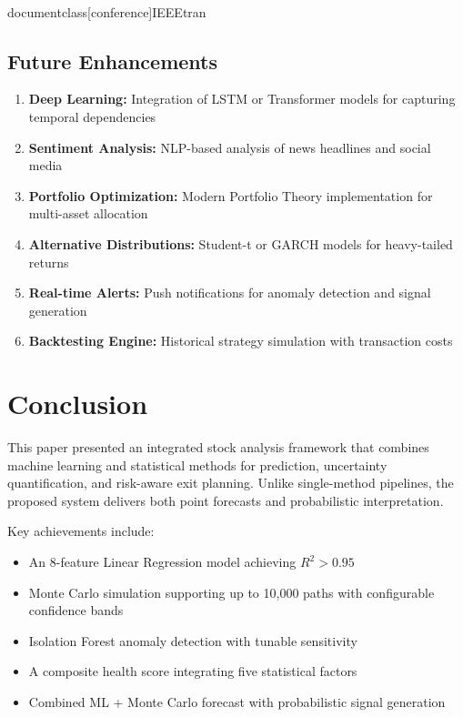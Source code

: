 \\documentclass[conference]{IEEEtran}
\begin{document}
\subsection{Future Enhancements}
\begin{enumerate}
    \item \textbf{Deep Learning:} Integration of LSTM or Transformer models for capturing temporal dependencies
    \item \textbf{Sentiment Analysis:} NLP-based analysis of news headlines and social media
    \item \textbf{Portfolio Optimization:} Modern Portfolio Theory implementation for multi-asset allocation
    \item \textbf{Alternative Distributions:} Student-t or GARCH models for heavy-tailed returns
    \item \textbf{Real-time Alerts:} Push notifications for anomaly detection and signal generation
    \item \textbf{Backtesting Engine:} Historical strategy simulation with transaction costs
\end{enumerate}

\section{Conclusion}
This paper presented an integrated stock analysis framework that combines machine learning and statistical methods for prediction, uncertainty quantification, and risk-aware exit planning. Unlike single-method pipelines, the proposed system delivers both point forecasts and probabilistic interpretation.

Key achievements include:
\begin{itemize}
    \item An 8-feature Linear Regression model achieving $R^2 > 0.95$
    \item Monte Carlo simulation supporting up to 10,000 paths with configurable confidence bands
    \item Isolation Forest anomaly detection with tunable sensitivity
    \item A composite health score integrating five statistical factors
    \item Combined ML + Monte Carlo forecast with probabilistic signal generation
\end{itemize}
\end{document}
